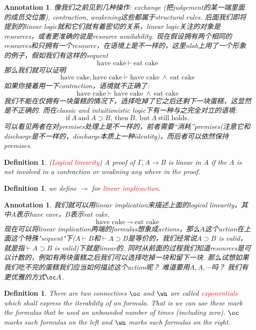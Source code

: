 \documentclass{article}
\theoremstyle{plain}
\newtheorem{definition}[theorem]{Definition}
\newtheorem{annotation}[theorem]{Annotation}
\theoremstyle{nonumberplain}
\newcommand{\redt}[1]{\textcolor{red}{#1}}
\begin{document}
\begin{annotation}
\rm 像我们之前见到几种操作: exchange (把judgement的某一端里面的成员交位置), contraction, weakening这些都属于structural rules. 后面我们即将提到的linear logic就和它们就有着密切的关系，linear logic关注的对象是resources，或者更准确的说是resource availability. 现在假设拥有两个相同的resources和只拥有一个resource，在语境上是不一样的，这里nlab上用了一个形象的例子，假如我们有这样的sequent
\[
	\text{have cake} ~\vdash ~ \text{eat cake}
\]
那么我们就可以证明
\[
\text{have cake}, \text{have cake} \vdash \text{have cake}~\wedge ~\text{eat cake}  
\]
如果你接着用一下contraction，语境就不正确了:
\[
	\text{have cake} \vdash \text{have cake}~\wedge ~\text{eat cake}
\]
我们不能在仅拥有一块蛋糕的情况下，选择吃掉了它之后还剩下一块蛋糕，这显然是不正确的. 而在classic and intuitionistic logic下有一种与之完全对立的语境:
\[
	\text{if}~A~\text{and}~A \supset B,~\text{then}~B, ~\text{but}~A~\text{still holds}.
\]
可以看见两者在对premises处理上是不一样的，前者需要“消耗”premises(注意它和discharge是不一样的，discharge本质上一种identity)，而后者可以依然保持premises.
\end{annotation}

\begin{definition}
\rm (\redt{Logical linearity}) A proof of $\Gamma,A \to B$ is linear in $A$ if the $A$ is not involved in a contraction or weakning any where in the proof.
\end{definition}

\begin{definition}
\rm we define $\multimap$ for \redt{linear implicaction}.
\end{definition}

\begin{annotation}
\rm 我们就可以用linear implication来描述上面的logical linearity，其中$A$表示have cave，$B$表示eat cake. 
\[
	\text{have cake} ~\multimap ~ \text{eat cake}
\]
现在可以将linear implication两端的formulas想象成actions，那么$A$这个action在上面这个特殊"sequent"下($A \vdash B$和$\vdash A \supset B$是等价的，我们经常说$A \supset B$ is valid，就是指$\vdash A \supset B$ is valid)下就是linear的. 同时从前面的过程我们知道resources是可以计数的，例如有两块蛋糕之后我们可以选择吃掉一块和留下一块. 那么试想如果我们吃不完的蛋糕我们应当如何描述这个action呢？ 难道要用$A, A, \cdots$吗？ 我们有更优雅的方式$\oc A$.
\end{annotation}

\begin{definition}
\rm There are two connectives $\oc$ and $\wn$ are called \redt{exponentials} which shall express the iterability of an formula.  That is we can use these mark the formulas that be used an unbounded number of times (including zero). $\oc$ marks such formulas on the left and $\wn$ marks such formulas on the right. 
\end{definition}
\end{document}
